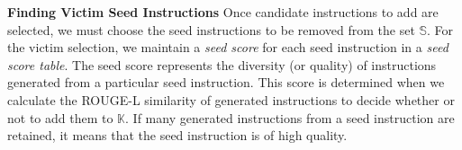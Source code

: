 \begin{comment}
\cancel{
Once instructions to add are decided, we should choose victim seed instructions that will be removed from $\mathbb{S}$. The victim seed instruction is selected based on its \textit{score} that indicates the diversity of the generated instructions produced by corresponding seed instruction. This score is maintained in the \textit{seed instruction score table}. When a seed is added, it is included in the table; conversely, when it is evicted, it is removed from the table.

The score is calculated as illustrated in Figure 6, an example of this process. During the generation phase, a subset $\mathbb{S}'$ in the same manner in line 1 of Algorithm~\ref{alg:diversity-filtering}. For instance, assume that $seed_a$, $seed_b$, and $seed_c$ are selected. Using these three seed instructions, generated instructions $\mathbb{G}$ are produced. In the example, five generated instructions are created.
Subsequently, in the filtering phase, one generated instruction is discarded, and four will be included in the kept instructions $\mathbb{K}$. After this phase, the seed instruction score table is updated. For each seed instruction that participated in this generation (in this case, $seed_a$, $seed_b$, and $seed_c$), the \textit{SeedGen} is incremented by the number of generated instructions, which is five. Simultaneously, the \textit{SeedKept} is incremented by the number of instructions that passed the filtering, which is four. These values accumulate over the generations.
Finally, the score of the participating three seed instructions is updated, which is computed as the ratio of \textit{SeedKept} to \textit{SeedGen}. For example, the score of $seed_b$ was $21/25 = 0.84$, but after this generation, it is updated to $(21+4)/(25+5) = 0.83$.

When the seed add operation is invoked every ten iterations, the seed instruction with the lowest score is evicted from $\mathbb{S}$ and the seed instruction score table. A lower value indicates that the seed instruction is not generating diverse instructions effectively. As a result, the iterative feedback task generation allows for adding seed instructions with potentially high quality to $\mathbb{S}$ while evicting those that have not performed well in generating diverse instruction. This process ensures that the seed instruction set $\mathbb{S}$ is maintained at the highest quality.
}
\end{comment}

\textbf{Finding Victim Seed Instructions}
Once candidate instructions to add are selected, we must choose 
the seed instructions to be removed from the set $\mathbb{S}$.
For the victim selection, we maintain a \textit{seed score}
for each seed instruction in a \textit{seed score table}. 
The seed score represents the diversity (or quality) of 
instructions generated from a particular seed instruction. 
This score is determined when we calculate the ROUGE-L similarity of 
generated instructions to decide whether or not to add them to 
$\mathbb{K}$.
If many generated instructions from a seed instruction are retained, 
it means that the seed instruction is of high quality.

